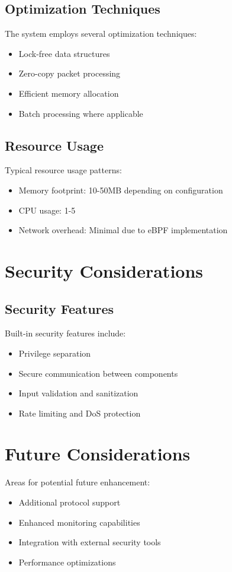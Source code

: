 \documentclass{article}
\begin{document}
\subsection{Optimization Techniques}
The system employs several optimization techniques:
\begin{itemize}
    \item Lock-free data structures
    \item Zero-copy packet processing
    \item Efficient memory allocation
    \item Batch processing where applicable
\end{itemize}

\subsection{Resource Usage}
Typical resource usage patterns:
\begin{itemize}
    \item Memory footprint: 10-50MB depending on configuration
    \item CPU usage: 1-5%
    \item Network overhead: Minimal due to eBPF implementation
\end{itemize}

\section{Security Considerations}
\subsection{Security Features}
Built-in security features include:
\begin{itemize}
    \item Privilege separation
    \item Secure communication between components
    \item Input validation and sanitization
    \item Rate limiting and DoS protection
\end{itemize}

\section{Future Considerations}
Areas for potential future enhancement:
\begin{itemize}
    \item Additional protocol support
    \item Enhanced monitoring capabilities
    \item Integration with external security tools
    \item Performance optimizations
\end{itemize}
\end{document}
